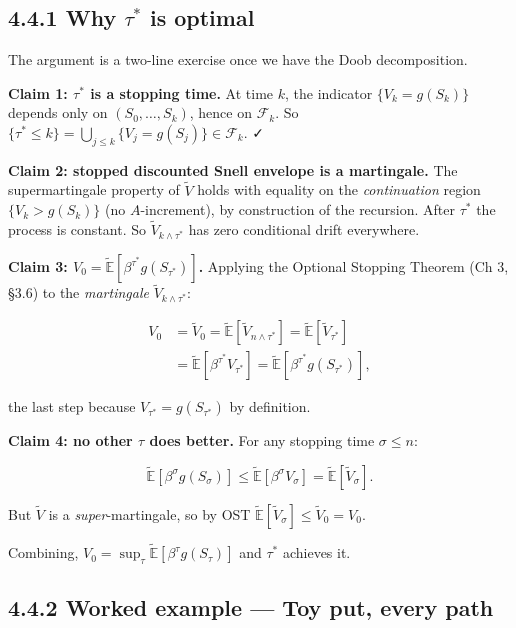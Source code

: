 \documentclass[
  10pt,
  twoside]{book}
\begin{document}
\subsection{\texorpdfstring{4.4.1 Why \(\tau^*\) is
optimal}{4.4.1 Why \textbackslash tau\^{}* is optimal}}\label{why-tau-is-optimal}

The argument is a two-line exercise once we have the Doob decomposition.

\textbf{Claim 1: \(\tau^*\) is a stopping time.} At time \(k\), the
indicator \(\{V_k = g(S_k)\}\) depends only on \((S_0, \dots, S_k)\),
hence on \(\mathcal F_k\). So
\(\{\tau^* \le k\} = \bigcup_{j \le k}\{V_j = g(S_j)\} \in \mathcal F_k\).
✓

\textbf{Claim 2: stopped discounted Snell envelope is a martingale.} The
supermartingale property of \(\tilde V\) holds with equality on the
\emph{continuation} region \(\{V_k > g(S_k)\}\) (no \(A\)-increment), by
construction of the recursion. After \(\tau^*\) the process is constant.
So \(\tilde V_{k \wedge \tau^*}\) has zero conditional drift everywhere.

\textbf{Claim 3:
\(V_0 = \tilde{\mathbb{E}}[\beta^{\tau^*} g(S_{\tau^*})]\).} Applying
the Optional Stopping Theorem (Ch 3, §3.6) to the \emph{martingale}
\(\tilde V_{k\wedge \tau^*}\):

\[\begin{aligned}
V_0 &= \tilde V_0 = \tilde{\mathbb{E}}[\tilde V_{n \wedge \tau^*}] = \tilde{\mathbb{E}}[\tilde V_{\tau^*}] \\
&= \tilde{\mathbb{E}}[\beta^{\tau^*} V_{\tau^*}] = \tilde{\mathbb{E}}[\beta^{\tau^*} g(S_{\tau^*})],
\end{aligned}\]

the last step because \(V_{\tau^*} = g(S_{\tau^*})\) by definition.

\textbf{Claim 4: no other \(\tau\) does better.} For any stopping time
\(\sigma \le n\):

\[\tilde{\mathbb{E}}[\beta^\sigma g(S_\sigma)] \le \tilde{\mathbb{E}}[\beta^\sigma V_\sigma] = \tilde{\mathbb{E}}[\tilde V_\sigma].\]

But \(\tilde V\) is a \emph{super}-martingale, so by OST
\(\tilde{\mathbb{E}}[\tilde V_\sigma] \le \tilde V_0 = V_0\).

Combining, \(V_0 = \sup_\tau \tilde{\mathbb{E}}[\beta^\tau g(S_\tau)]\)
and \(\tau^*\) achieves it.

\subsection{4.4.2 Worked example --- Toy put, every
path}\label{worked-example-toy-put-every-path}
\end{document}

